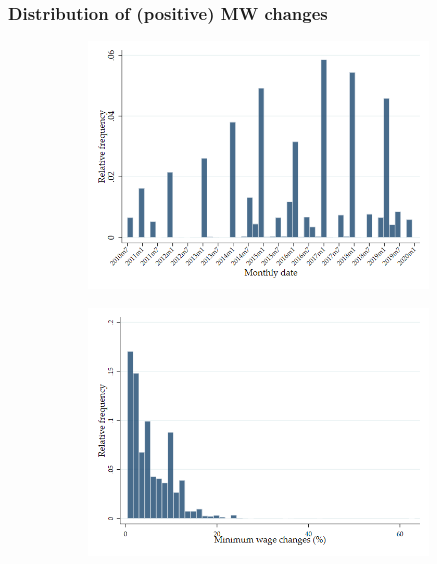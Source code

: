 \documentclass[aspectratio=169, t]{beamer}
\begin{document}
\begin{frame}[label=dist_mw_changes]
	\frametitle{Distribution of (positive) MW changes}
	\begin{figure}
		\begin{subfigure}{0.49\textwidth}
			\includegraphics[width = 0.99\textwidth]{describe_estimation_samples/output/pct_ch_mw_date_dist.png}
		\end{subfigure}%
		\begin{subfigure}{0.49\textwidth}
			\includegraphics[width = 0.99\textwidth]{describe_estimation_samples/output/pct_ch_mw_dist.png}
		\end{subfigure}
	\end{figure}
	
	\hyperlink{stat_MW}{}
\end{frame}
\end{document}
